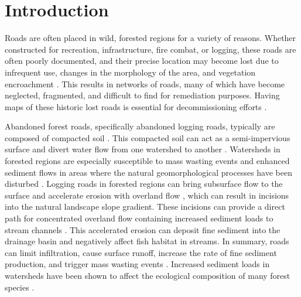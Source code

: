 \documentclass[remotesensing,article,accept,pdftex,moreauthors]{Definitions/mdpi}
\begin{document}



\section{Introduction}

Roads are often placed in wild, forested regions for a variety of reasons. Whether constructed for recreation, infrastructure, fire combat, or logging, these roads are often poorly documented, and their precise location may become lost due to infrequent use, changes in the morphology of the area, and vegetation encroachment \cite{becker, sherba}. This results in networks of roads, many of which have become neglected, fragmented, and difficult to find for remediation purposes. Having maps of these historic lost roads is essential for decommissioning efforts \cite{white}.

Abandoned forest roads, specifically abandoned logging roads, typically are composed of compacted soil \cite{rab}. This compacted soil can act as a semi-impervious surface and divert water flow from one watershed to another \cite{troendle}. Watersheds in forested regions are especially susceptible to mass wasting events and enhanced sediment flows in areas where the natural geomorphological processes have been disturbed \cite{luce}. Logging roads in forested regions can bring subsurface flow to the surface and accelerate erosion with overland flow \cite{underwood}, which can result in incisions into the natural landscape slope gradient. These incisions can provide a direct path for concentrated overland flow containing increased sediment loads to stream channels \cite{douglas}. This accelerated erosion can deposit fine sediment into the drainage basin and negatively affect fish habitat in streams. In summary, roads can limit infiltration, cause surface runoff, increase the rate of fine sediment production, and trigger mass wasting events \cite{wemple}. Increased sediment loads in watersheds have been shown to affect the ecological composition of many forest species \cite{wong}. 
\end{document}
